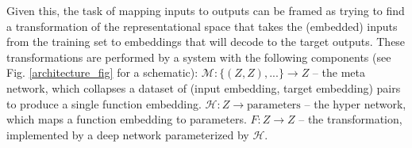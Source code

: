 \documentclass{article}
\begin{document}
Given this, the task of mapping inputs to outputs can be framed as trying to find a transformation of the representational space that takes the (embedded) inputs from the training set to embeddings that will decode to the target outputs. These transformations are performed by a system with the following components (see Fig. \ref{architecture_fig} for a schematic): $\mathcal{M}: \{(Z, Z), ...\} \rightarrow Z $ -- the meta network, which collapses a dataset of (input embedding, target embedding) pairs to produce a single function embedding. $\mathcal{H}: Z \rightarrow \text{parameters}$ -- the hyper network, which maps a function embedding to parameters. $F: Z \rightarrow Z$ -- the transformation, implemented by a deep network parameterized by $\mathcal{H}$. \par
\vspace{-0.5em}
\end{document}
